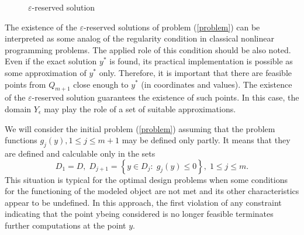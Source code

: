 \documentclass[review]{elsarticle}
\begin{document}
\begin{figure}[h]
	\caption{$\varepsilon$-reserved solution}
	\label{fig:eps_reserved_solution}
\end{figure}

	The existence of the $\varepsilon$-reserved solutions of problem (\ref{problem}) can be interpreted as some analog of the regularity condition in classical nonlinear programming problems. The applied role of this condition should be also noted. Even if the exact solution $y^\ast$ is found, its practical implementation is possible as some approximation of $y^\ast$ only. Therefore, it is important that there are feasible points from $Q_{m+1}$ close enough to $y^\ast$ (in coordinates and values). The existence of the $\varepsilon$-reserved solution guarantees the existence of such points. In this case, the domain $Y_{\epsilon}$ may play the role of a set of suitable approximations.

	We will consider the initial problem (\ref{problem}) assuming that the problem functions $g_{j}(y), 1 \leq j \leq m+1$ may be defined only partly. It means that they are defined and calculable only in the sets 
\begin{equation}\label{D_sets}
	D_1 = D, \; D_{j+1} = \left\{ y \in D_j: \; g_j(y) \leq 0 \right\}, \; 1 \leq j \leq m.
\end{equation}
This situation is typical for the optimal design problems when some conditions for the functioning of the modeled object are not met and its other characteristics appear to be undefined. In this approach, the first violation of any constraint indicating that the point ybeing considered is no longer feasible terminates further computations at the point $y$.
\end{document}
